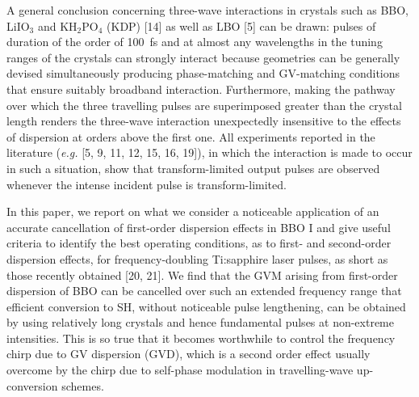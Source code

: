 \documentclass[times]{jtitauth}
\begin{document}
A general conclusion concerning three-wave interactions in
crystals such as BBO, LiIO$_3$ and KH$_2$PO$_4$ (KDP) [14] as well
as LBO [5] can be drawn: pulses of duration of the order of 100~fs
and at almost any wavelengths in the tuning ranges of the crystals
can strongly interact because geometries can be generally devised
simultaneously producing phase-matching and GV-matching conditions
that ensure suitably broadband interaction. Furthermore, making
the pathway over which the three travelling pulses are
superimposed greater than the crystal length renders the
three-wave inter\-action unexpectedly insensitive to the effects
of dispersion at orders above the first one. All experiments
reported in the literature ({\it e.g.} [5, 9, 11, 12, 15, 16,
19]), in which the interaction is made to occur in such a
situation, show that transform-limited output pulses are observed
whenever the intense incident pulse is transform-limited.

In this paper, we report on what we consider a noticeable
application of an accurate cancellation of first-order dispersion
effects in BBO I and give useful criteria to  identify the best
operating conditions, as to first- and second-order dispersion
effects, for frequency-doubling Ti:sapphire laser pulses, as short
as those recently obtained [20, 21]. We find that the GVM arising
from first-order dispersion of BBO can be cancelled over such an
extended frequency range that efficient conversion to SH, without
noticeable pulse lengthening, can be obtained by using relatively
long crystals and hence fundamental pulses at non-extreme
intensities. This is so true that it becomes worthwhile to control
the frequency chirp due to GV dispersion (GVD), which is a second
order effect usually overcome by the chirp due to self-phase
modulation in travelling-wave up-conversion schemes.
\end{document}
